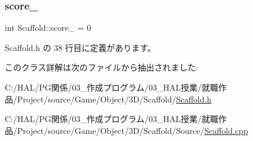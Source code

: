 \subsubsection{\texorpdfstring{score\+\_\+}{score\_}}
{\footnotesize\ttfamily int Scaffold\+::score\+\_\+ = 0\hspace{0.3cm}{\ttfamily [private]}}



 Scaffold.\+h の 38 行目に定義があります。



このクラス詳解は次のファイルから抽出されました\+:\begin{DoxyCompactItemize}
\item 
C\+:/\+H\+A\+L/\+P\+G関係/03\+\_\+作成プログラム/03\+\_\+\+H\+A\+L授業/就職作品/\+Project/source/\+Game/\+Object/3\+D/\+Scaffold/\mbox{\hyperlink{_scaffold_8h}{Scaffold.\+h}}\item 
C\+:/\+H\+A\+L/\+P\+G関係/03\+\_\+作成プログラム/03\+\_\+\+H\+A\+L授業/就職作品/\+Project/source/\+Game/\+Object/3\+D/\+Scaffold/\+Source/\mbox{\hyperlink{_scaffold_8cpp}{Scaffold.\+cpp}}\end{DoxyCompactItemize}
